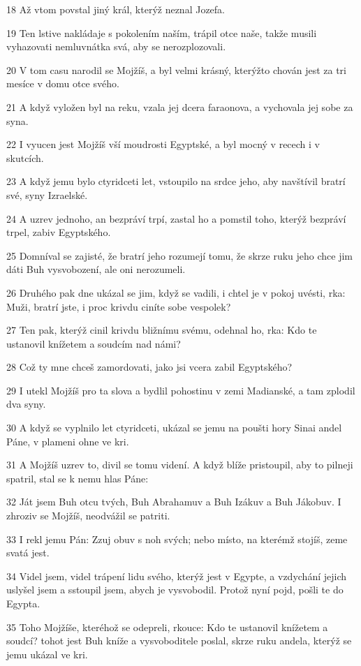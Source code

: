 \par 18 Až vtom povstal jiný král, kterýž neznal Jozefa.
\par 19 Ten lstive nakládaje s pokolením naším, trápil otce naše, takže musili vyhazovati nemluvnátka svá, aby se nerozplozovali.
\par 20 V tom casu narodil se Mojžíš, a byl velmi krásný, kterýžto chován jest za tri mesíce v domu otce svého.
\par 21 A když vyložen byl na reku, vzala jej dcera faraonova, a vychovala jej sobe za syna.
\par 22 I vyucen jest Mojžíš vší moudrosti Egyptské, a byl mocný v recech i v skutcích.
\par 23 A když jemu bylo ctyridceti let, vstoupilo na srdce jeho, aby navštívil bratrí své, syny Izraelské.
\par 24 A uzrev jednoho, an bezpráví trpí, zastal ho a pomstil toho, kterýž bezpráví trpel, zabiv Egyptského.
\par 25 Domníval se zajisté, že bratrí jeho rozumejí tomu, že skrze ruku jeho chce jim dáti Buh vysvobození, ale oni nerozumeli.
\par 26 Druhého pak dne ukázal se jim, když se vadili, i chtel je v pokoj uvésti, rka: Muži, bratrí jste, i proc krivdu ciníte sobe vespolek?
\par 27 Ten pak, kterýž cinil krivdu bližnímu svému, odehnal ho, rka: Kdo te ustanovil knížetem a soudcím nad námi?
\par 28 Což ty mne chceš zamordovati, jako jsi vcera zabil Egyptského?
\par 29 I utekl Mojžíš pro ta slova a bydlil pohostinu v zemi Madianské, a tam zplodil dva syny.
\par 30 A když se vyplnilo let ctyridceti, ukázal se jemu na poušti hory Sinai andel Páne, v plameni ohne ve kri.
\par 31 A Mojžíš uzrev to, divil se tomu videní. A když blíže pristoupil, aby to pilneji spatril, stal se k nemu hlas Páne:
\par 32 Ját jsem Buh otcu tvých, Buh Abrahamuv a Buh Izákuv a Buh Jákobuv. I zhroziv se Mojžíš, neodvážil se patriti.
\par 33 I rekl jemu Pán: Zzuj obuv s noh svých; nebo místo, na kterémž stojíš, zeme svatá jest.
\par 34 Videl jsem, videl trápení lidu svého, kterýž jest v Egypte, a vzdychání jejich uslyšel jsem a sstoupil jsem, abych je vysvobodil. Protož nyní pojd, pošli te do Egypta.
\par 35 Toho Mojžíše, kteréhož se odepreli, rkouce: Kdo te ustanovil knížetem a soudcí? tohot jest Buh kníže a vysvoboditele poslal, skrze ruku andela, kterýž se jemu ukázal ve kri.
